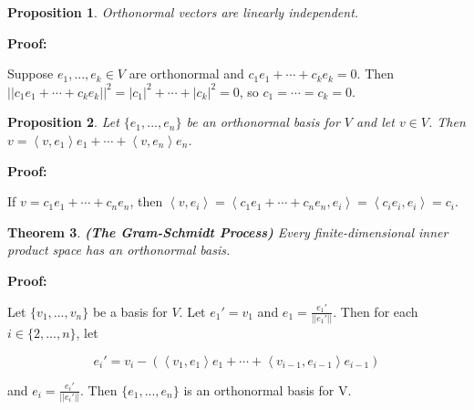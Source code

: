\documentclass{article}
\theoremstyle{colontheorem}
\newtheorem{theorem}{Theorem}[section]
\newtheorem{proposition}[theorem]{Proposition}
\newenvironment{Theorem}
{
	\begin{mdframed}[backgroundcolor=TheoremOrange!10]
	\begin{theorem}
}
{
	\end{theorem}
	\end{mdframed}
	
	\vspace{.15in}
}
\newenvironment{Proposition}
{
	\begin{mdframed}[backgroundcolor=TheoremOrange!10]
	\begin{proposition}
}
{
	\end{proposition}
	\end{mdframed}
	
	\vspace{.15in}
}
\newenvironment{Proof}
{
	\vspace{-.3in}
	
	\begin{mdframed}[backgroundcolor=ProofPurple!10]
	\textbf{Proof:}%
}
{
	\end{mdframed}
	
	\vspace{.15in}
}
\begin{document}
\begin{Proposition}
	
	Orthonormal vectors are linearly independent.
	
\end{Proposition}



\begin{Proof}
	Suppose $e_1, ..., e_k \in V$ are orthonormal and $c_1 e_1 + \cdots + c_k e_k = 0$. Then $||c_1 e_1 + \cdots + c_k e_k||^2 = |c_1|^2 + \cdots + |c_k|^2 = 0$, so $c_1 = \cdots = c_k = 0$.
	
\end{Proof}




\begin{Proposition}
	
	Let $\{e_1, ..., e_n\}$ be an orthonormal basis for $V$ and let $v \in V$. Then $v = \left< v, e_1 \right> e_1 + \cdots + \left< v, e_n \right> e_n$.
	
\end{Proposition}



\begin{Proof}
	If $v = c_1 e_1 + \cdots + c_n e_n$, then $\left< v, e_i \right> = \left< c_1 e_1 + \cdots + c_n e_n, e_i \right> = \left< c_i e_i, e_i \right> = c_i$.
	
\end{Proof}




\begin{Theorem}
	
	\textbf{(The Gram-Schmidt Process)} Every finite-dimensional inner product space has an orthonormal basis.
	
\end{Theorem}



\begin{Proof}
	Let $\{v_1, ..., v_n\}$ be a basis for $V$. Let $e_1' = v_1$ and $e_1 = \frac{e_1'}{||e_1'||}$. Then for each $i \in \{2, ..., n\}$, let
	
	$$
		e_i' = v_i - \left( \left< v_1, e_1 \right> e_1 + \cdots + \left< v_{i-1}, e_{i-1} \right> e_{i-1} \right)
	$$ 
	
	and $e_i = \frac{e_i'}{||e_i'||}$. Then $\{e_1, ..., e_n\}$ is an orthonormal basis for V.
	
\end{Proof}
\end{document}

